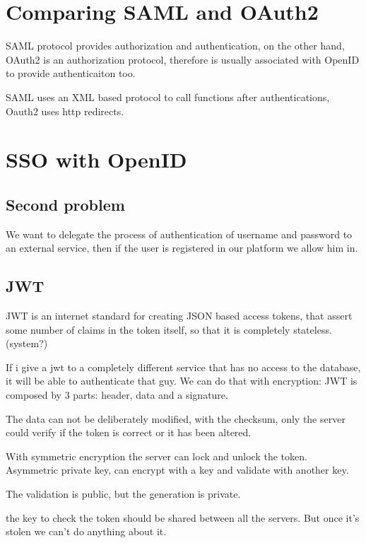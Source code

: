 \documentclass{style}
\begin{document}
\section{Comparing SAML and OAuth2}
SAML protocol provides authorization and authentication, on the other hand,
OAuth2 is an authorization protocol, therefore is usually associated with OpenID
to provide authenticaiton too.

SAML uses an XML based protocol to call functions after authentications, Oauth2
uses http redirects.




\section{SSO with OpenID}
\subsection{Second problem}
We want to delegate the process of authentication of username and password
to an external service, then if the user is registered in our platform we
allow him in.

\subsection{JWT}
JWT is an internet standard for creating JSON based access tokens,
that assert some number of claims in the token itself, so that it is
completely stateless. (system?)

If i give a jwt to a completely different service that has no access to the
database, it will be able to authenticate that guy.
We can do that with encryption: JWT is composed by 3 parts: header, data and a
signature.

The data can not be deliberately modified, with the checksum, only the server
could verify if the token is correct or it has been altered.

With symmetric encryption the server can lock and unlock the token.
Asymmetric private key, can encrypt with a key and validate with another key.

The validation is public, but the generation is private.


the key to check the token should be shared between all the servers.
But once it's stolen we can't do anything about it.
\end{document}
